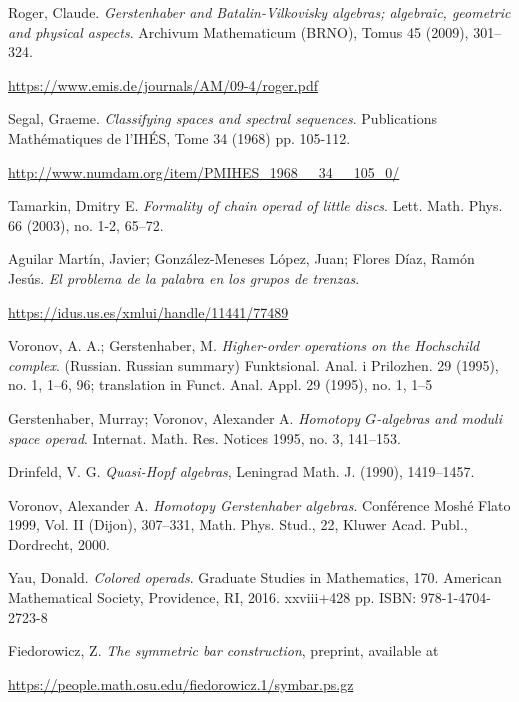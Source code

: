 \documentclass[TFM.tex]{subfiles}
\begin{document}
\begin{thebibliography}{}
 Roger, Claude. \emph{Gerstenhaber and Batalin-Vilkovisky algebras; algebraic, geometric and physical aspects}. Archivum Mathematicum (BRNO), Tomus 45 (2009), 301–324. 

\url{https://www.emis.de/journals/AM/09-4/roger.pdf}


 Segal, Graeme. \emph{Classifying spaces and spectral sequences}. Publications Mathématiques de l'IHÉS, Tome 34 (1968) pp. 105-112.

 \url{http://www.numdam.org/item/PMIHES_1968__34__105_0/} %


 Tamarkin, Dmitry E. \emph{Formality of chain operad of little discs}. Lett. Math. Phys. 66 (2003), no. 1-2, 65–72. 


 Aguilar Martín, Javier; González-Meneses López, Juan; Flores Díaz, Ramón Jesús. \emph{El problema de la palabra en los grupos de trenzas}.

 \url{https://idus.us.es/xmlui/handle/11441/77489}
 
 

 Voronov, A. A.; Gerstenhaber, M.
\emph{Higher-order operations on the Hochschild complex}. (Russian. Russian summary) 
Funktsional. Anal. i Prilozhen. 29 (1995), no. 1, 1--6, 96; translation in 
Funct. Anal. Appl. 29 (1995), no. 1, 1–5 
 
  Gerstenhaber, Murray; Voronov, Alexander A. \emph{Homotopy $G$-algebras and moduli space operad}. Internat. Math. Res. Notices 1995, no. 3, 141–153.
 
 Drinfeld, V. G. \emph{Quasi-Hopf algebras}, Leningrad Math. J. (1990), 1419–1457.



 Voronov, Alexander A. \emph{Homotopy Gerstenhaber algebras}. Conférence Moshé Flato 1999, Vol. II (Dijon), 307–331, Math. Phys. Stud., 22, Kluwer Acad. Publ., Dordrecht, 2000.


 Yau, Donald. \emph{Colored operads}. Graduate Studies in Mathematics, 170. American Mathematical Society, Providence, RI, 2016. xxviii+428 pp. ISBN: 978-1-4704-2723-8


 Fiedorowicz, Z. \emph{The symmetric bar construction}, preprint, available at 

\url{https://people.math.osu.edu/fiedorowicz.1/symbar.ps.gz}









\end{thebibliography}
\end{document}
